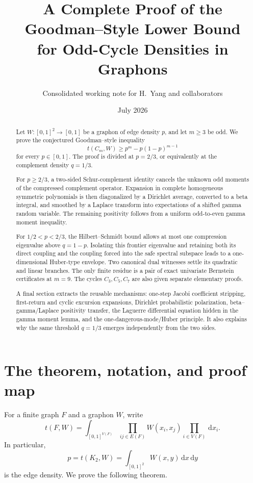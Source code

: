 \documentclass[11pt]{article}
\title{A Complete Proof of the Goodman--Style Lower Bound\\
for Odd-Cycle Densities in Graphons}
\author{Consolidated working note for H.~Yang and collaborators}
\date{July 2026}
\numberwithin{equation}{section}
\newcommand{\dd}{\,\mathrm d}
\begin{document}
\maketitle

\begin{abstract}
  Let $W:[0,1]^2\to[0,1]$ be a graphon of edge density $p$, and let $m\ge3$ be odd.
  We prove the conjectured Goodman--style inequality
  \[
    t(C_m,W)\ge p^m-p(1-p)^{m-1}
  \]
  for every $p\in[0,1]$.
  The proof is divided at $p=2/3$, or equivalently at the complement density $q=1/3$.

  For $p\ge2/3$, a two-sided Schur-complement identity cancels the unknown odd moments of the compressed complement operator.
  Expansion in complete homogeneous symmetric polynomials is then diagonalized by a Dirichlet average, converted to a beta integral, and smoothed by a Laplace transform into expectations of a shifted gamma random variable.
  The remaining positivity follows from a uniform odd-to-even gamma moment inequality.

  For $1/2<p<2/3$, the Hilbert--Schmidt bound allows at most one compression eigenvalue above $q=1-p$.
  Isolating this frontier eigenvalue and retaining both its direct coupling and the coupling forced into the safe spectral subspace leads to a one-dimensional Huber-type envelope.
  Two canonical dual witnesses settle its quadratic and linear branches.
  The only finite residue is a pair of exact univariate Bernstein certificates at $m=9$.
  The cycles $C_3,C_5,C_7$ are also given separate elementary proofs.

  A final section extracts the reusable mechanisms: one-step Jacobi coefficient stripping, first-return and cyclic excursion expansions, Dirichlet probabilistic polarization, beta--gamma/Laplace positivity transfer, the Laguerre differential equation hidden in the gamma moment lemma, and the one-dangerous-mode/Huber principle.
  It also explains why the same threshold $q=1/3$ emerges independently from the two sides.
\end{abstract}

\tableofcontents

\section{The theorem, notation, and proof map}\label{sec:intro}

For a finite graph $F$ and a graphon $W$, write
\[
  t(F,W)=\int_{[0,1]^{V(F)}}
  \prod_{ij\in E(F)}W(x_i,x_j)
  \prod_{i\in V(F)}\dd x_i.
\]
In particular,
\[
  p=t(K_2,W)=\int_{[0,1]^2}W(x,y)\dd x\dd y
\]
is the edge density.
We prove the following theorem.
\end{document}
